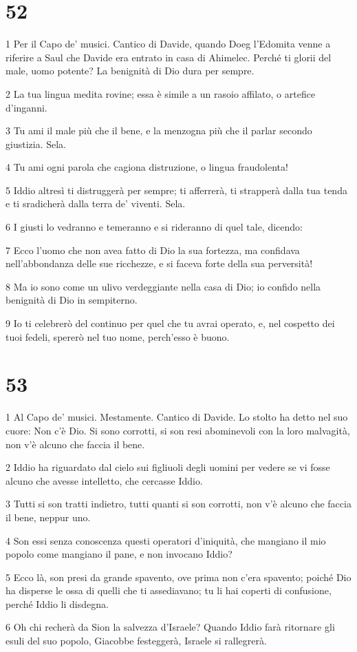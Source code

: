 \chapter{52}

\par 1 Per il Capo de' musici. Cantico di Davide, quando Doeg l'Edomita venne a riferire a Saul che Davide era entrato in casa di Ahimelec. Perché ti glorii del male, uomo potente? La benignità di Dio dura per sempre.
\par 2 La tua lingua medita rovine; essa è simile a un rasoio affilato, o artefice d'inganni.
\par 3 Tu ami il male più che il bene, e la menzogna più che il parlar secondo giustizia. Sela.
\par 4 Tu ami ogni parola che cagiona distruzione, o lingua fraudolenta!
\par 5 Iddio altresì ti distruggerà per sempre; ti afferrerà, ti strapperà dalla tua tenda e ti sradicherà dalla terra de' viventi. Sela.
\par 6 I giusti lo vedranno e temeranno e si rideranno di quel tale, dicendo:
\par 7 Ecco l'uomo che non avea fatto di Dio la sua fortezza, ma confidava nell'abbondanza delle sue ricchezze, e si faceva forte della sua perversità!
\par 8 Ma io sono come un ulivo verdeggiante nella casa di Dio; io confido nella benignità di Dio in sempiterno.
\par 9 Io ti celebrerò del continuo per quel che tu avrai operato, e, nel cospetto dei tuoi fedeli, spererò nel tuo nome, perch'esso è buono.

\chapter{53}

\par 1 Al Capo de' musici. Mestamente. Cantico di Davide. Lo stolto ha detto nel suo cuore: Non c'è Dio. Si sono corrotti, si son resi abominevoli con la loro malvagità, non v'è alcuno che faccia il bene.
\par 2 Iddio ha riguardato dal cielo sui figliuoli degli uomini per vedere se vi fosse alcuno che avesse intelletto, che cercasse Iddio.
\par 3 Tutti si son tratti indietro, tutti quanti si son corrotti, non v'è alcuno che faccia il bene, neppur uno.
\par 4 Son essi senza conoscenza questi operatori d'iniquità, che mangiano il mio popolo come mangiano il pane, e non invocano Iddio?
\par 5 Ecco là, son presi da grande spavento, ove prima non c'era spavento; poiché Dio ha disperse le ossa di quelli che ti assediavano; tu li hai coperti di confusione, perché Iddio li disdegna.
\par 6 Oh chi recherà da Sion la salvezza d'Israele? Quando Iddio farà ritornare gli esuli del suo popolo, Giacobbe festeggerà, Israele si rallegrerà.

